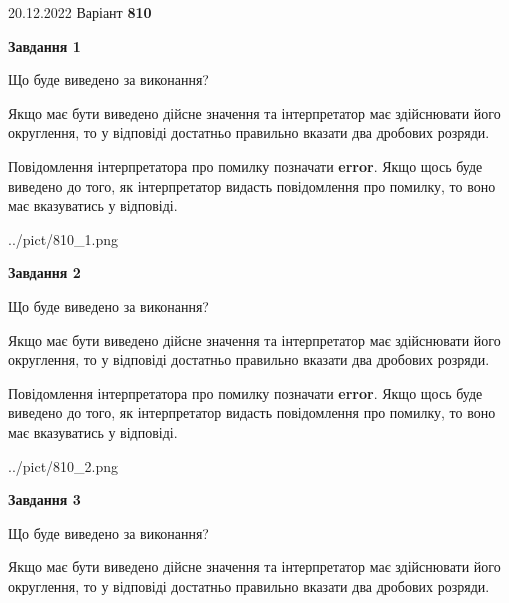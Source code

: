 \documentclass[12pt, ukrainian]{article}
\begin{document}
{20.12.2022 Варіант \No \textbf { 810 }\par}
{
\begin {Large}

{\begin {center}\textbf{Завдання 1}\end {center}}\par
Що буде виведено за виконання? \par

Якщо має бути виведено дійсне значення та інтерпретатор має здійснювати його округлення, 
то у відповіді достатньо правильно вказати два дробових розряди.

Повідомлення інтерпретатора про помилку позначати \textbf{error}.
Якщо щось буде виведено до того, як інтерпретатор видасть повідомлення про помилку, 
то воно має вказуватись у відповіді. \par

\begin{center}
	{../pict/810_1.png}
\end{center}
\newpage

{\begin {center}\textbf{Завдання 2}\end {center}}\par
Що буде виведено за виконання? \par

Якщо має бути виведено дійсне значення та інтерпретатор має здійснювати його округлення, 
то у відповіді достатньо правильно вказати два дробових розряди.

Повідомлення інтерпретатора про помилку позначати \textbf{error}.
Якщо щось буде виведено до того, як інтерпретатор видасть повідомлення про помилку, 
то воно має вказуватись у відповіді. \par

\begin{center}
	{../pict/810_2.png}
\end{center}
\newpage

{\begin {center}\textbf{Завдання 3}\end {center}}\par
Що буде виведено за виконання? \par

Якщо має бути виведено дійсне значення та інтерпретатор має здійснювати його округлення, 
то у відповіді достатньо правильно вказати два дробових розряди.


\end{Large}}
\end{document}
